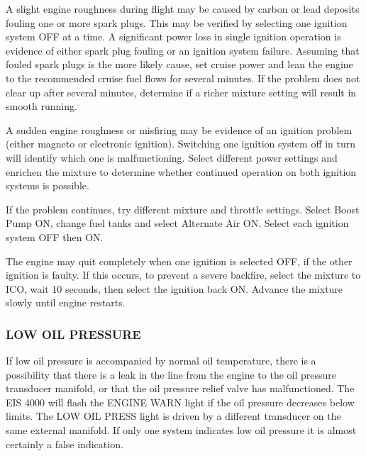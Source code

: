 A slight engine roughness during flight may be caused by carbon or lead deposits fouling one or more spark plugs. 
This may be verified by selecting one ignition system OFF at a time.  A significant power loss in single ignition
operation is evidence of either spark plug fouling or an ignition system failure.  Assuming that fouled spark plugs is
the more likely cause, set cruise power and lean the engine to the recommended cruise fuel flows for several minutes. 
If the problem does not clear up after several minutes, determine if a richer mixture setting will result in smooth
running.

A sudden engine roughness or misfiring may be evidence of an ignition problem (either magneto or electronic ignition).
 Switching one ignition system off in turn will identify which one is malfunctioning.  Select different power settings
and enrichen the mixture to determine whether continued operation on both ignition systems is possible.

If the problem continues, try different mixture and throttle settings. Select Boost Pump ON,
change fuel tanks and select Alternate Air ON. Select each ignition system
OFF then ON.

\begin{Note}[CAUTION]
The engine may quit completely when one ignition is selected OFF, if the other ignition is faulty.  
If this occurs, to prevent a severe backfire, select the mixture to ICO, wait 10 seconds, then select the ignition back ON.
Advance the mixture slowly until engine restarts.
\end{Note}

%

\subsubsection{LOW OIL PRESSURE}

If low oil pressure is accompanied by normal oil temperature, there is a possibility that there is a leak in the line
from the engine to the oil pressure transducer manifold, or that the oil pressure relief valve has malfunctioned.  The
EIS 4000
will flash the ENGINE WARN light if the oil pressure decreases below limits. The LOW OIL PRESS light is driven by a
different transducer on the same external manifold. If only one system indicates low oil pressure it is almost certainly
a false indication.

